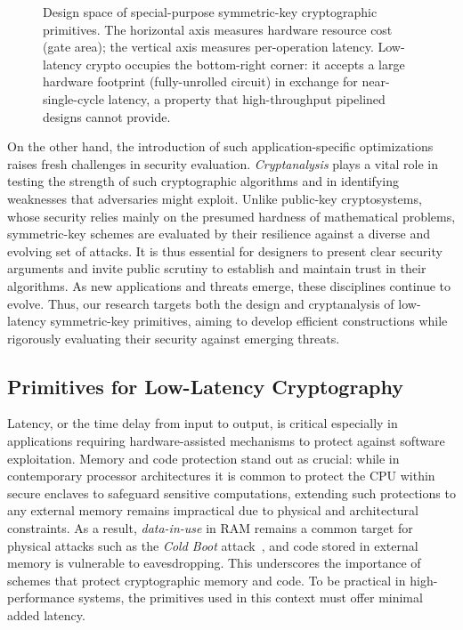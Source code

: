 \begin{figure}[htbp]
\caption{Design space of special-purpose symmetric-key cryptographic primitives.
  The horizontal axis measures hardware resource cost (gate area); the vertical axis
  measures per-operation latency.
  Low-latency crypto occupies the bottom-right corner: it accepts a large hardware
  footprint (fully-unrolled circuit) in exchange for near-single-cycle latency,
  a property that high-throughput pipelined designs cannot provide.}
\label{fig:design-space}
\end{figure}

On the other hand, the introduction of such application-specific optimizations raises fresh challenges in security evaluation.
\emph{Cryptanalysis} plays a vital role in testing the strength of such cryptographic algorithms and in identifying weaknesses that adversaries might exploit.
Unlike public-key cryptosystems, whose security relies mainly on the presumed hardness of mathematical problems, symmetric-key schemes are evaluated by their resilience against a diverse and evolving set of attacks.
It is thus essential for designers to present clear security arguments and invite public scrutiny to establish and maintain trust in their algorithms.
As new applications and threats emerge, these disciplines continue to evolve.
Thus, our research targets both the design and cryptanalysis of low-latency symmetric-key primitives, aiming to develop efficient constructions while rigorously evaluating their security against emerging threats.

\subsection{Primitives for Low-Latency Cryptography}

Latency, or the time delay from input to output, is critical especially in applications requiring hardware-assisted mechanisms to protect against software exploitation.
Memory and code protection stand out as crucial: while in contemporary processor architectures it is common to protect the CPU within secure enclaves to safeguard sensitive computations, extending such protections to any external memory remains impractical due to physical and architectural constraints.
As a result, \emph{data-in-use} in RAM remains a common target for physical attacks such as the \emph{Cold Boot} attack~\cite{DBLP:conf/uss/HaldermanSHCPCFAF08}, and code stored in external memory is vulnerable to eavesdropping.
This underscores the importance of schemes that protect cryptographic memory and code.
To be practical in high-performance systems, the primitives used in this context must offer minimal added latency.

